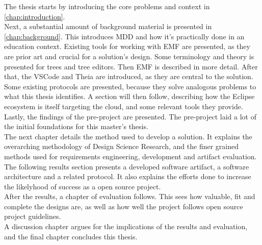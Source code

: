 The thesis starts by introducing the core problems and context in \cref{chap:introduction}.\\

Next, a substantial amount of background material is presented in \cref{chap:background}.
This introduces \acrlong{MDD} and how it's practically done in an education context.
Existing tools for working with \acrshort{EMF} are presented, as they are prior art and crucial for a solution's design.
Some terminology and theory is presented for trees and tree editors.
Then \acrshort{EMF} is described in more detail.
After that, the \gls{VSCode} and \gls{Theia}  are introduced, as they are central to the solution.
Some existing protocols are presented, because they solve analogous problems to what this thesis identifies.
A section will then follow, describing how the Eclipse ecosystem is itself targeting the \gls{cloud}, and some relevant tools they provide.
Lastly, the findings of the pre-project are presented.
The pre-project laid a lot of the initial foundations for this master's thesis.\\

The next chapter details the method used to develop a solution.
It explains the overarching methodology of Design Science Research, and the finer grained methods used for requirements engineering, development and artifact evaluation.\\

The following results section presents a developed software artifact, a software architecture and a related protocol.
It also explains the efforts done to increase the likelyhood of success as a \gls{open source} project.\\

After the results, a chapter of evaluation follows.
This sees how valuable, fit and complete the designs are, as well as how well the project follows \gls{open source} project guidelines.\\

A discussion chapter argues for the implications of the results and evaluation,
and the final chapter concludes this thesis.